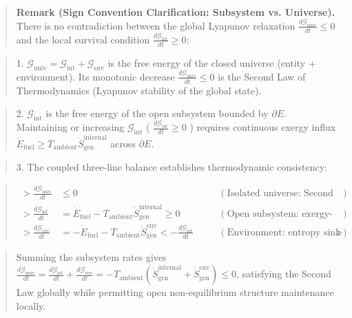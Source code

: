 \documentclass[11pt,a4paper]{article}
\theoremstyle{definition}\newtheorem{definition}{Definition}
\theoremstyle{remark}\newtheorem{remark}{Remark}
\begin{document}
\begin{quote}\textbf{Remark (Sign Convention Clarification: Subsystem vs. Universe).} There is no contradiction between the global Lyapunov relaxation $\frac{d\mathcal{G}_{\text{univ}}}{dt} \le 0$ and the local survival condition $\frac{d\mathcal{G}_{\text{int}}}{dt} \ge 0$:\end{quote}
\begin{quote}1. $\mathcal{G}_{\text{univ}} = \mathcal{G}_{\text{int}} + \mathcal{G}_{\text{env}}$ is the free energy of the closed universe (entity + environment). Its monotonic decrease $\frac{d\mathcal{G}_{\text{univ}}}{dt} \le 0$ is the Second Law of Thermodynamics (Lyapunov stability of the global state).\end{quote}
\begin{quote}2. $\mathcal{G}_{\text{int}}$ is the free energy of the open subsystem bounded by $\partial E$. Maintaining or increasing $\mathcal{G}_{\text{int}}$ ( $\frac{d\mathcal{G}_{\text{int}}}{dt} \ge 0$ ) requires continuous exergy influx $\dot{E}_{\text{fuel}} \ge T_{\text{ambient}} \dot{S}_{\text{gen}}^{\text{internal}}$ across $\partial E$.\end{quote}
\begin{quote}3. The coupled three-line balance establishes thermodynamic consistency:\end{quote}
\begin{quote}
\begin{equation}
\begin{aligned}
> \frac{d\mathcal{G}_{\text{univ}}}{dt} &\le 0 \quad &&(\text{Isolated universe: Second Law / Lyapunov relaxation}) \\
> \frac{d\mathcal{G}_{\text{int}}}{dt} &= \dot{E}_{\text{fuel}} - T_{\text{ambient}} \dot{S}_{\text{gen}}^{\text{internal}} \ge 0 \quad &&(\text{Open subsystem: exergy-driven boundary persistence}) \\
> \frac{d\mathcal{G}_{\text{env}}}{dt} &= -\dot{E}_{\text{fuel}} - T_{\text{ambient}} \dot{S}_{\text{gen}}^{\text{env}} < -\frac{d\mathcal{G}_{\text{int}}}{dt} \quad &&(\text{Environment: entropy sink absorbing exported dissipation})
> \end{aligned}
\end{equation}
\end{quote}
\begin{quote}Summing the subsystem rates gives $\frac{d\mathcal{G}_{\text{univ}}}{dt} = \frac{d\mathcal{G}_{\text{int}}}{dt} + \frac{d\mathcal{G}_{\text{env}}}{dt} = -T_{\text{ambient}} (\dot{S}_{\text{gen}}^{\text{internal}} + \dot{S}_{\text{gen}}^{\text{env}}) \le 0$, satisfying the Second Law globally while permitting open non-equilibrium structure maintenance locally.\end{quote}
\end{document}
